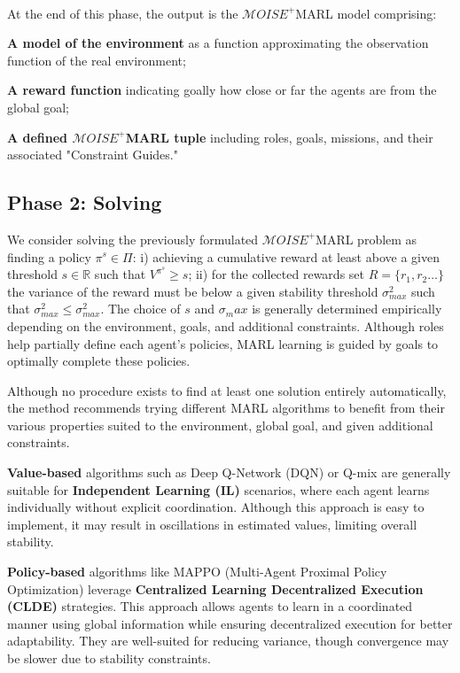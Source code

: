 \documentclass[conference]{IEEEtran}
\begin{document}
\

At the end of this phase, the output is the $\mathcal{M}OISE^+$MARL model comprising:
\begin{enumerate*}[label={\roman*)}]
    \item \textbf{A model of the environment} as a function approximating the observation function of the real environment;
    \item \textbf{A reward function} indicating goally how close or far the agents are from the global goal;
    \item \textbf{A defined $\mathcal{M}OISE^+$MARL tuple} including roles, goals, missions, and their associated "Constraint Guides."
\end{enumerate*}

\subsection{Phase 2: Solving}

We consider solving the previously formulated $\mathcal{M}OISE^+$MARL problem as finding a policy $\pi^s \in \Pi$: \quad i) achieving a cumulative reward at least above a given threshold $s \in \mathbb{R}$ such that $V^{\pi^s} \geq s$; \quad ii) for the collected rewards set $R = \{r_1, r_2\dots\}$ the variance of the reward must be below a given stability threshold $\sigma_{max}^2$ such that $\sigma_{max}^2 \leq \sigma_{max}^2$. The choice of $s$ and $\sigma_max$ is generally determined empirically depending on the environment, goals, and additional constraints. Although roles help partially define each agent's policies, MARL learning is guided by goals to optimally complete these policies.

Although no procedure exists to find at least one solution entirely automatically, the method recommends trying different MARL algorithms to benefit from their various properties suited to the environment, global goal, and given additional constraints.

\textbf{Value-based} algorithms such as Deep Q-Network (DQN) or Q-mix are generally suitable for \textbf{Independent Learning (IL)} scenarios, where each agent learns individually without explicit coordination. Although this approach is easy to implement, it may result in oscillations in estimated values, limiting overall stability.

\textbf{Policy-based} algorithms like MAPPO (Multi-Agent Proximal Policy Optimization) leverage \textbf{Centralized Learning Decentralized Execution (CLDE)} strategies. This approach allows agents to learn in a coordinated manner using global information while ensuring decentralized execution for better adaptability. They are well-suited for reducing variance, though convergence may be slower due to stability constraints.
\end{document}
